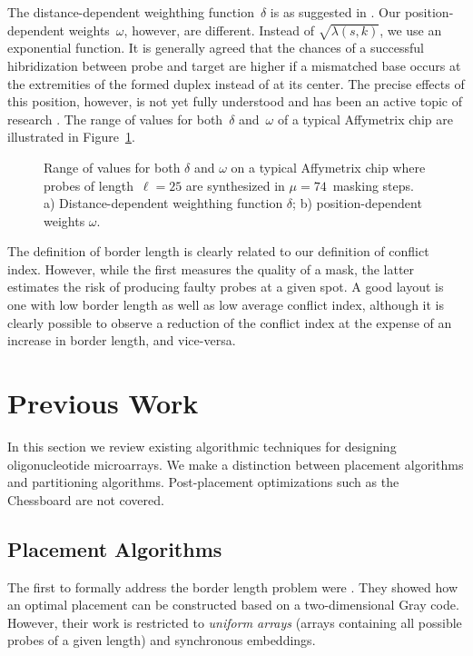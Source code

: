 \documentclass{bioinfo}
\begin{document}
The distance-dependent weighthing function~$\delta$ is as suggested in \citealp{KAHNG03A}. Our position-dependent weights~$\omega$, however, are different. Instead of $\sqrt{\lambda(s,k)}$, we use an exponential function. It is generally agreed that the chances of a successful hibridization between probe and target are higher if a mismatched base occurs at the extremities of the formed duplex instead of at its center. The precise effects of this position, however, is not yet fully understood and has been an active topic of research \citep{BINDER05}. The range of values for both~$\delta$ and~$\omega$ of a typical Affymetrix chip are illustrated in Figure~\ref{fig:conflit_index_values}.

\begin{figure}
\caption{Range of values for both $\delta$ and $\omega$ on a typical Affymetrix chip where probes of length~$\ell = 25$ are synthesized in $\mu = 74$~masking steps. a) Distance-dependent weighthing function $\delta$; b) position-dependent weights $\omega$.}
\label{fig:conflit_index_values}
\end{figure}

The definition of border length is clearly related to our definition of conflict index. However, while the first measures the quality of a mask, the latter estimates the risk of producing faulty probes at a given spot. A good layout is one with low border length as well as low average conflict index, although it is clearly possible to observe a reduction of the conflict index at the expense of an increase in border length, and vice-versa.

\section{Previous Work}
\label{sec:previous_work}

In this section we review existing algorithmic techniques for designing oligonucleotide microarrays. We make a distinction between placement algorithms and partitioning algorithms. Post-placement optimizations such as the Chessboard \citep{KAHNG02} are not covered.

\subsection{Placement Algorithms}
\label{sec:placement_alg}

The first to formally address the border length problem were \citealp{FELDMAN93}. They showed how an optimal placement can be constructed based on a two-dimensional Gray code. However, their work is restricted to \emph{uniform arrays} (arrays containing all possible probes of a given length) and synchronous embeddings.
\end{document}
